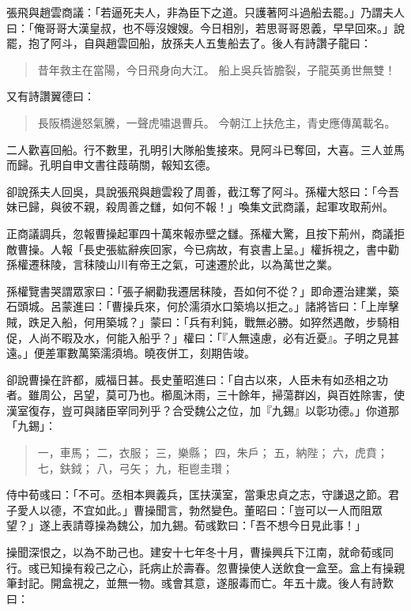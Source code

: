 張飛與趙雲商議：「若逼死夫人，非為臣下之道。只護著阿斗過船去罷。」乃謂夫人曰：「俺哥哥大漢皇叔，也不辱沒嫂嫂。今日相別，若思哥哥恩義，早早回來。」說罷，抱了阿斗，自與趙雲回船，放孫夫人五隻船去了。後人有詩讚子龍曰：

\begin{quote}
昔年救主在當陽，今日飛身向大江。
船上吳兵皆膽裂，子龍英勇世無雙！
\end{quote}

又有詩讚翼德曰：

\begin{quote}
長阪橋邊怒氣騰，一聲虎嘯退曹兵。
今朝江上扶危主，青史應傳萬載名。
\end{quote}

二人歡喜回船。行不數里，孔明引大隊船隻接來。見阿斗已奪回，大喜。三人並馬而歸。孔明自申文書往葭萌關，報知玄德。

卻說孫夫人回吳，具說張飛與趙雲殺了周善，截江奪了阿斗。孫權大怒曰：「今吾妹已歸，與彼不親，殺周善之讎，如何不報！」喚集文武商議，起軍攻取荊州。

正商議調兵，忽報曹操起軍四十萬來報赤壁之讎。孫權大驚，且按下荊州，商議拒敵曹操。人報「長史張紘辭疾回家，今已病故，有哀書上呈。」權拆視之，書中勸孫權遷秣陵，言秣陵山川有帝王之氣，可速遷於此，以為萬世之業。

孫權覽書哭謂眾家曰：「張子網勸我遷居秣陵，吾如何不從？」即命遷治建業，築石頭城。呂蒙進曰：「曹操兵來，何於濡須水口築塢以拒之。」諸將皆曰：「上岸擊賊，跌足入船，何用築城？」蒙曰：「兵有利鈍，戰無必勝。如猝然遇敵，步騎相促，人尚不暇及水，何能入船乎？」權曰：「『人無遠慮，必有近憂』。子明之見甚遠。」便差軍數萬築濡須塢。曉夜併工，刻期告竣。

卻說曹操在許都，威福日甚。長史董昭進曰：「自古以來，人臣未有如丞相之功者。雖周公，呂望，莫可乃也。櫛風沐雨，三十餘年，掃蕩群凶，與百姓除害，使漢室復存，豈可與諸臣宰同列乎？合受魏公之位，加『九錫』以彰功德。」你道那「九錫」：

\begin{quote}
一，車馬；
二，衣服；
三，樂縣；
四，朱戶；
五，納陛；
六，虎賁；
七，鈇鉞；
八，弓矢；
九，秬鬯圭瓚；
\end{quote}

侍中荀彧曰：「不可。丞相本興義兵，匡扶漢室，當秉忠貞之志，守謙退之節。君子愛人以德，不宜如此。」曹操聞言，勃然變色。董昭曰：「豈可以一人而阻眾望？」遂上表請尊操為魏公，加九錫。荀彧歎曰：「吾不想今日見此事！」

操聞深恨之，以為不助己也。建安十七年冬十月，曹操興兵下江南，就命荀彧同行。彧已知操有殺己之心，託病止於壽春。忽曹操使人送飲食一盒至。盒上有操親筆封記。開盒視之，並無一物。彧會其意，遂服毒而亡。年五十歲。後人有詩歎曰：

